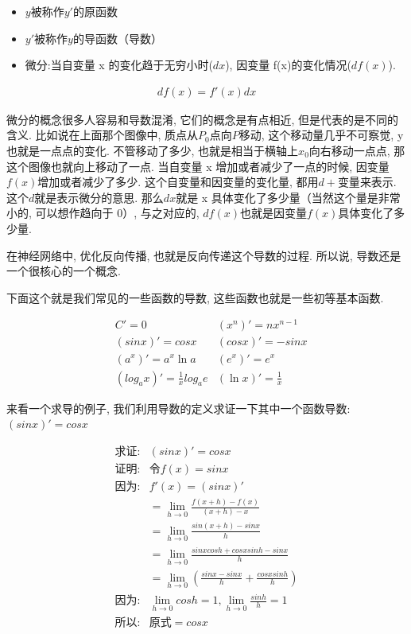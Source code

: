 \begin{itemize}
  \item $y$被称作$y'$的原函数
  \item $y'$被称作$y$的导函数（导数）
  \item 微分:当自变量 x 的变化趋于无穷小时($dx$), 因变量 f(x)的变化情况($df(x)$). 
\end{itemize}

\begin{align*}
  df(x)=f'(x)dx
\end{align*}

微分的概念很多人容易和导数混淆, 它们的概念是有点相近, 但是代表的是不同的含义. 比如说在上面那个图像中, 质点从$P_0$点向$P$移动, 这个移动量几乎不可察觉, y 也就是一点点的变化. 不管移动了多少, 也就是相当于横轴上$x_0$向右移动一点点, 那这个图像也就向上移动了一点. 当自变量 x 增加或者减少了一点的时候, 因变量$f(x)$增加或者减少了多少. 这个自变量和因变量的变化量, 都用$d+\mbox{变量}$来表示. 这个$d$就是表示微分的意思. 那么$dx$就是 x 具体变化了多少量（当然这个量是非常小的, 可以想作趋向于 0）, 与之对应的, $df(x)$也就是因变量$f(x)$具体变化了多少量. 

在神经网络中, 优化反向传播, 也就是反向传递这个导数的过程. 所以说, 导数还是一个很核心的一个概念. 

下面这个就是我们常见的一些函数的导数, 这些函数也就是一些初等基本函数. 

\begin{align*}
  & C'=0 & (x^n)'=nx^{n-1} \\
  & (sinx)'=cosx & (cosx)'=-sinx \\
  & (a^x)'=a^x \ln a & (e^x)'=e^x \\
  & (log_a{x})'=\frac{1}{x}log_a{e} & (\ln x)'=\frac{1}{x}
\end{align*}

来看一个求导的例子, 我们利用导数的定义求证一下其中一个函数导数: $(sinx)'=cosx$

\begin{align*}
  \mbox{求证}:&  (sinx)'=cosx \\
  \mbox{证明}:& \mbox{令}f(x)=sinx \\
  \mbox{因为}:& f'(x)=(sinx)' \\ 
  & =\lim_{h\to0}\frac{f(x+h)-f(x)}{(x+h)-x} \\
  & =\lim_{h\to0}\frac{sin(x+h) - sinx}{h} \\ 
  & =\lim_{h\to0}\frac{sinx cosh + cosx sinh - sinx}{h} \\
  & =\lim_{h\to0}(\frac{sinx - sinx}{h} + \frac{cosx sinh}{h}) \\
  \mbox{因为}: & \lim_{h\to 0}cosh=1, \lim_{h\to0}\frac{sinh}{h}=1 \\
  \mbox{所以}: & \mbox{原式} =cosx
\end{align*}

